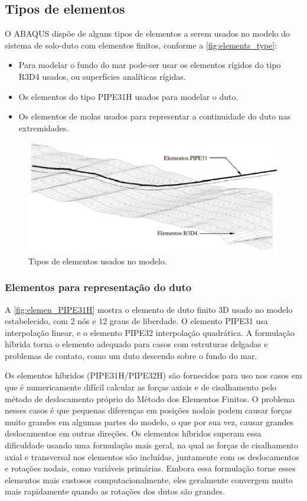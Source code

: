 \subsection{Tipos de elementos}

O ABAQUS dispõe de alguns tipos de elementos a serem usados no modelo do sistema de solo-duto com elementos finitos, conforme a \autoref{fig:elements_type}:

\begin{itemize}
    \item Para modelar o fundo do mar pode-ser usar os elementos rígidos do tipo R3D4 usados, ou superfícies analíticas rígidas.
    \item Os elementos do tipo PIPE31H usados para modelar o duto.
    \item Os elementos de molas usados para representar a continuidade do duto nas extremidades.
\end{itemize}

\begin{figure}[!ht]
    \centering
    \caption{Tipos de elementos usados no modelo.}\label{fig:elements_type}
    \includegraphics[width=0.8\linewidth]{imagens/elements_types}
\end{figure}

\subsubsection{Elementos para representação do duto}

A \autoref{fig:elemen_PIPE31H} mostra o elemento de duto finito 3D usado no modelo estabelecido, com 2 nós e 12 graus de liberdade.
O elemento PIPE31 usa interpolação linear, e o elemento PIPE32 interpolação quadrática.
A formulação híbrida torna o elemento adequado para casos com estruturas delgadas e problemas de contato, como um duto descendo sobre o fundo do mar.

Os elementos híbridos (PIPE31H/PIPE32H) são fornecidos para uso nos casos em que é numericamente difícil calcular as forças axiais e de cisalhamento pelo método de deslocamento próprio do Método dos Elementos Finitos.
O problema nesses casos é que pequenas diferenças em posições nodais podem causar forças muito grandes em algumas partes do modelo, o que por sua vez, causar grandes deslocamentos em outras direções.
Os elementos híbridos superam essa dificuldade usando uma formulação mais geral, na qual as forças de cisalhamento axial e transversal nos elementos são incluídas, juntamente com os deslocamentos e rotações nodais, como variáveis primárias.
Embora essa formulação torne esses elementos mais custosos computacionalmente, eles geralmente convergem muito mais rapidamente quando as rotações dos dutos são grandes.

